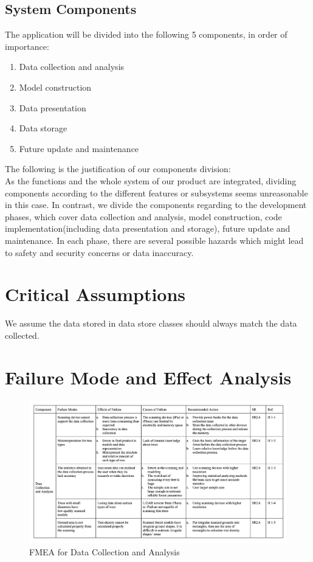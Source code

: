 \documentclass{article}
\begin{document}
\subsection{System Components}
The application will be divided into the following 5 components, in order of importance:
\begin{enumerate}
    \item Data collection and analysis
    \item Model construction
    \item Data presentation
    \item Data storage
    \item Future update and maintenance 
\end{enumerate}
\noindent The following is the justification of our components division:\\
As the functions and the whole system of our product are integrated,
dividing components according to the different features or subsystems seems
unreasonable in this case. In contrast, we divide the components regarding to
the development phases, which cover data collection and analysis, model construction, code implementation(including data
presentation and storage), future update and maintenance. In each phase, there are several possible hazards which
might lead to safety and security concerns or data inaccuracy. 

\section{Critical Assumptions}

We assume the data stored in data store classes should always match the data
collected.

\newpage

\section{Failure Mode and Effect Analysis}

\begin{figure}[H]
\begin{flushleft}
\begin{center}
    \includegraphics[scale = 0.55]{HA_Pictures/Data_CA.png}
\end{center}
    \caption{FMEA for Data Collection and Analysis}
    \end{flushleft}
\end{figure}
\end{document}
